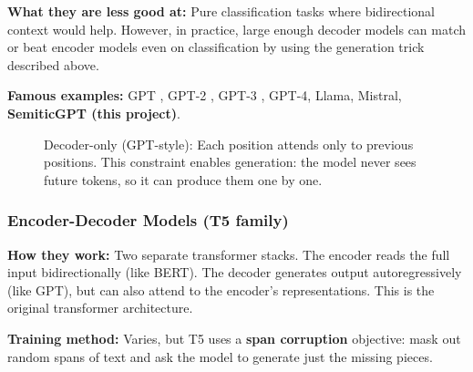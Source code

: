 \documentclass[11pt,a4paper]{article}
\begin{document}
\textbf{What they are less good at:} Pure classification tasks where bidirectional context would help. However, in practice, large enough decoder models can match or beat encoder models even on classification by using the generation trick described above.

\textbf{Famous examples:} GPT \citep{radford2018gpt}, GPT-2 \citep{radford2019gpt2}, GPT-3 \citep{brown2020gpt3}, GPT-4, Llama, Mistral, \textbf{SemiticGPT (this project)}.

\begin{figure}[H]
\centering
{}
\caption{Decoder-only (GPT-style): Each position attends only to previous positions. This constraint enables generation: the model never sees future tokens, so it can produce them one by one.}
\label{fig:decoder}
\end{figure}

\subsubsection{Encoder-Decoder Models (T5 family)}

\textbf{How they work:} Two separate transformer stacks. The encoder reads the full input bidirectionally (like BERT). The decoder generates output autoregressively (like GPT), but can also attend to the encoder's representations. This is the original transformer architecture.

\textbf{Training method:} Varies, but T5 \citep{raffel2020t5} uses a \textbf{span corruption} objective: mask out random spans of text and ask the model to generate just the missing pieces.
\end{document}
